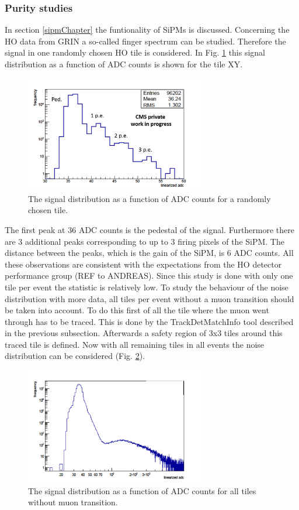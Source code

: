 		\subsubsection{Purity studies}
			In section \ref{sipmChapter} the funtionality of SiPMs is discussed.
			Concerning the HO data from GRIN a so-called finger spectrum can be studied.
			Therefore the signal in one randomly chosen HO tile is considered.
			In Fig. \ref{fig:noise_low} this signal distribution as a function of ADC counts is shown for the tile XY.
			\begin{figure}[htbp]
				\centering
				\includegraphics[width=0.70\textwidth]{Figures/erdogan/noise_low.png}
				\caption{The signal distribution as a function of ADC counts for a randomly chosen tile.}
				\label{fig:noise_low}
			\end{figure}
			The first peak at 36 ADC counts is the pedestal of the signal.
			Furthermore there are 3 additional peaks corresponding to up to 3 firing pixels of the SiPM.
			The distance between the peaks, which is the gain of the SiPM, is 6 ADC counts.
			All these observations are consistent with the expectations from the HO detector performance group (REF to ANDREAS).
			Since this study is done with only one tile per event the statistic is relatively low.
			To study the behaviour of the noise distribution with more data, all tiles per event without a muon transition should be taken into account.
			To do this first of all the tile where the muon went through has to be traced.
			This is done by the TrackDetMatchInfo tool described in the previous subsection.
			Afterwards a safety region of 3x3 tiles around this traced tile is defined.
			Now with all remaining tiles in all events the noise distribution can be considered (Fig. \ref{fig:noise_high}).
			\begin{figure}[htbp]
				\centering
				\includegraphics[width=0.70\textwidth]{Figures/erdogan/noise_high.png}
				\caption{The signal distribution as a function of ADC counts for all tiles without muon transition.}
				\label{fig:noise_high}
			\end{figure}
